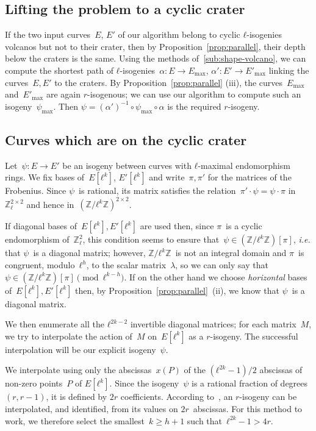 \documentclass{lms}
\begin{document}
\subsection{Lifting the problem to a cyclic crater}

If the two input curves~$E$, $E'$ of our algorithm
belong to cyclic $ℓ$-isogenies volcanos but not to their crater,
then by Proposition~\ref{prop:parallel},
their depth below the craters is the same.
Using the methods of~\ref{sub:shape-volcano},
we can compute the shortest path of $ℓ$-isogenies~$α: E → E_{\max}$,
$α': E' → E'_{\max}$ linking the curves~$E, E'$ to the craters.
By Proposition~\ref{prop:parallel} (iii),
the curves~$E_{\max}$ and~$E'_{\max}$ are again $r$-isogenous;
we can use our algorithm to compute such an isogeny~$ψ_{\max}$.
Then $ψ = (α')^{-1} ∘ ψ_{\max} ∘ α$ is the required $r$-isogeny.

 \subsection{Curves which are on the cyclic crater}

Let~$ψ: E→ E'$ be an isogeny between curves
with $ℓ$-maximal endomorphism rings.
We fix bases of~$E[ℓ^k]$, $E'[ℓ^k]$ and write~$π, π'$ for the matrices
of the Frobenius.
Since $ψ$~is rational, its matrix satisfies the relation~$π' · ψ = ψ · π$
in $ℤ_ℓ^{2×2}$ and hence in~$(ℤ/ℓ^k ℤ)^{2 × 2}$.

If diagonal bases of~$E[ℓ^k], E'[ℓ^k]$ are used then,
since $π$~is a cyclic endomorphism of~$ℤ_ℓ^2$,
this condition seems to ensure that~$ψ ∈ (ℤ/ℓ^k ℤ)[π]$,
\emph{i.e.} that $ψ$~is a diagonal matrix;
however, $ℤ/ℓ^k ℤ$~is not an integral domain
and $π$~is congruent, modulo~$ℓ^h$, to the scalar matrix~$λ$,
so we can only say that~$ψ ∈ (ℤ/ℓ^k ℤ)[π] \pmod{ℓ^{k-h}}$.
If on the other hand we choose \emph{horizontal} bases
of~$E[ℓ^k], E'[ℓ^k]$ then, by Proposition~\ref{prop:parallel}~(ii),
we know that $ψ$~is a diagonal matrix.

We then enumerate all the $ℓ^{2k-2}$ invertible diagonal matrices;
for each matrix~$M$, we try to interpolate
the action of~$M$ on~$E[ℓ^k]$ as a $r$-isogeny.
The successful interpolation will be our explicit isogeny~$ψ$.

We interpolate using only the abscissas~$x(P)$
of the $(ℓ^{2k}-1)/2$ abscissas of non-zero points~$P$ of $E[ℓ^k]$.
Since the isogeny~$ψ$ is a rational fraction of degrees~$(r, r-1)$,
it is defined by $2r$ coefficients.
According to~\cite[§3.1]{df10},
an $r$-isogeny can be interpolated, and identified,
from its values on $2r$~abscissas.
For this method to work, we therefore select the smallest~$k ≥ h+1$
such that~$ℓ^{2k}-1 > 4r$.
\end{document}
